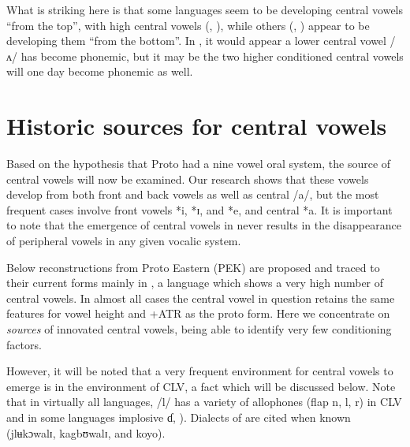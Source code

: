 \documentclass[output=paper,newtxmath,modfonts,nonflat,draft]{langsci/langscibook}
\begin{document}
What is striking here is that some languages seem to be developing central vowels “from the top”, with high central vowels (,  ), while others (, ) appear to be developing them “from the bottom”.  In , it would appear a lower central vowel /ʌ/ has become phonemic, but it may be the two higher conditioned central vowels will one day become phonemic as well. 

\section{Historic sources for central vowels}\label{sec:zogbo:3}

Based on the hypothesis that Proto  had a nine vowel oral system, the source of central vowels will now be examined.  Our research shows that these vowels develop from both front and back vowels as well as central /a/, but the most frequent cases involve front vowels *i, *ɪ, and *e, and central *a.  It is important to note that the emergence of central vowels in  never results in the disappearance of peripheral vowels in any given vocalic system.  

Below reconstructions from Proto Eastern  (PEK) are proposed and traced to their current forms mainly in , a language which shows a very high number of central vowels.  In almost all cases the central vowel in question retains the same features for vowel height and +ATR as the proto form.  Here we concentrate on \textit{sources} of innovated central vowels, being able to identify very few conditioning factors. 

However, it will be noted that a very frequent environment for central vowels to emerge is in the environment of CLV, a fact which will be discussed below.  Note that in virtually all  languages, /l/ has a variety of allophones (flap n, l, r) in CLV and in some languages implosive ɗ, \citealt{Marchese1979/1983}). Dialects of  are cited when known (jlʉkɔwalɪ, kagbʊwalɪ, and koyo).
\end{document}
